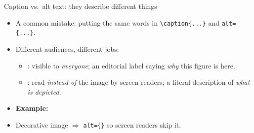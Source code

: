 \begin{frame}{Caption vs.\ alt text: they describe different things}
\begin{itemize}
\item A common mistake: putting the same words in \texttt{\textbackslash caption\{...\}} and \texttt{alt=\{...\}}.
\item Different audiences, different jobs:
  \begin{itemize}
  \item {}: visible to \emph{everyone}; an editorial label saying \emph{why} this figure is here.
  \item {}: read \emph{instead of} the image by screen readers; a literal description of \emph{what is depicted}.
  \end{itemize}

\bigskip

\item \textbf{Example:}

\medskip


\bigskip

\item Decorative image $\Rightarrow$ \texttt{alt=\{\}} so screen readers skip it.
\end{itemize}
\end{frame}

